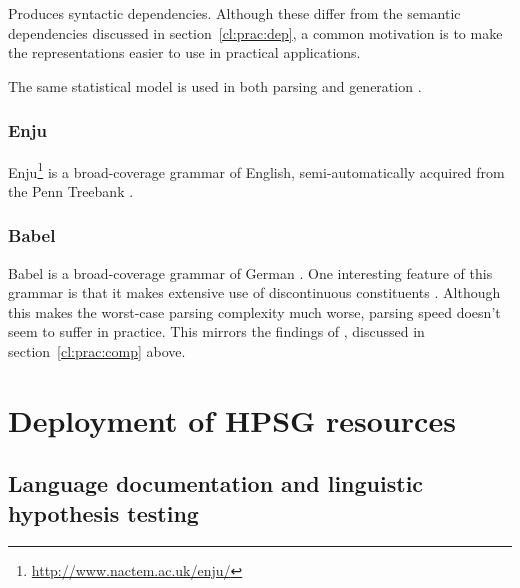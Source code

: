 \documentclass[output=paper,nonflat]{langsci/langscibook}
\begin{document}
Produces syntactic dependencies.
Although these differ from the semantic dependencies discussed in section~\ref{cl:prac:dep},
a common motivation is to make the representations easier to use in practical applications.

The same statistical model is used in both parsing and generation \citep{dekok2011reversible}.



\subsubsection{Enju}
\label{cl:other:enju}

Enju\footnote{%
	\url{http://www.nactem.ac.uk/enju/}
}
is a broad-coverage grammar of English,
semi-automatically acquired from the Penn Treebank \citep{MNT2005a-u}.



\subsubsection{Babel}
\label{cl:other:babel}

Babel is a broad-coverage grammar of German \citep{Babel,Mueller99a}.
One interesting feature of this grammar is that
it makes extensive use of discontinuous constituents \citep{Mueller2004b}.
Although this makes the worst-case parsing complexity much worse,
parsing speed doesn't seem to suffer in practice.
This mirrors the findings of \citet{Carroll94},
discussed in section~\ref{cl:prac:comp} above.






\section{Deployment of HPSG resources}
\label{cl:deployment}

\subsection{Language documentation and linguistic hypothesis testing}
\label{cl:lang-doc}
\end{document}
